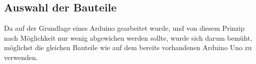 \subsection{Auswahl der Bauteile}
Da auf der Grundlage eines Arduino gearbeitet wurde, und von diesem Prinzip  nach Möglichkeit nur wenig abgewichen werden sollte, wurde sich darum bemüht, möglichst die gleichen Bauteile wie auf dem bereits vorhandenen Arduino Uno zu verwenden. 